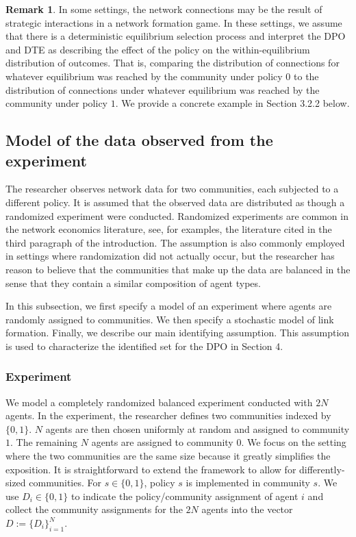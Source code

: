 \documentclass[12pt]{article}
\theoremstyle{definition}
\newtheorem{remark}{Remark}
\begin{document}
\begin{remark}
In some settings, the network connections may be the result of strategic interactions in a network formation game. In these settings, we assume that there is a deterministic equilibrium selection process and interpret the DPO and DTE as describing the effect of the policy on the within-equilibrium distribution of outcomes. That is, comparing the distribution of connections for whatever equilibrium was reached by the community under policy $0$ to the distribution of connections under whatever equilibrium was reached by the community under policy $1$. We provide a concrete example in Section 3.2.2 below.   
\end{remark}

\subsection{Model of the data observed from the experiment}
The researcher observes network data for two communities, each subjected to a different policy. It is assumed that the observed data are distributed as though a randomized experiment were conducted. Randomized experiments are common in the network economics literature, see, for examples, the literature cited in the third paragraph of the introduction. The assumption is also commonly employed in settings where randomization did not actually occur, but the researcher has reason to believe that the communities that make up the data are balanced in the sense that they contain a similar composition of agent types.  

In this subsection, we first specify a model of an experiment where agents are randomly assigned to communities. We then specify a stochastic model of link formation. Finally, we describe our main identifying assumption. This assumption is used to characterize the identified set for the DPO in Section 4.   

\subsubsection{Experiment}
We model a completely randomized balanced experiment conducted with $2N$ agents. In the experiment, the researcher defines two communities indexed by $\{0,1\}$. $N$ agents are then chosen uniformly at random and assigned to community $1$. The remaining $N$ agents are assigned to community $0$. We focus on the setting where the two communities are the same size because it greatly simplifies the exposition. It is straightforward to extend the framework to allow for differently-sized communities. For $s \in \{0,1\}$, policy $s$ is implemented in community $s$. We use $D_i \in \{0,1\}$ to indicate the policy/community assignment of agent $i$ and collect the community assignments for the $2N$ agents into the vector $D := \{D_i\}_{i=1}^{N}$.   
\end{document}
